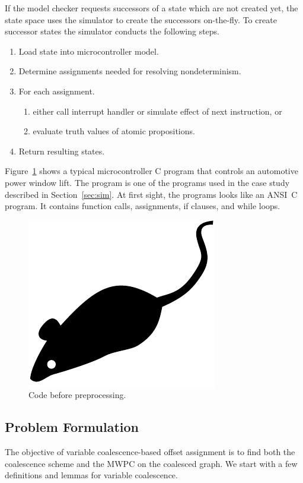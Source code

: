 \documentclass[prodmode,acmtecs]{acmsmall}
\begin{document}
\begin{algorithm}
\begin{algorithmic}[1]
If the model checker requests successors of a state which are not
created yet, the state space uses the simulator to create the
successors on-the-fly. To create successor states the simulator
conducts the following steps.
\begin{enumerate}
\item Load state into microcontroller model.
\item Determine assignments needed for resolving nondeterminism.
\item For each assignment.
      \begin{enumerate}
      \item either call interrupt handler or simulate effect of next instruction, or
      \item evaluate truth values of atomic propositions.
      \end{enumerate}
\item Return resulting states.
\end{enumerate}
Figure~\ref{fig:one} shows a typical microcontroller C program that
controls an automotive power window lift. The program is one of the
programs used in the case study described in Section~\ref{sec:sim}.
At first sight, the programs looks like an ANSI~C program. It
contains function calls, assignments, if clauses, and while loops.
\begin{figure}
\centerline{\includegraphics{acmsmall-mouse}}
\caption{Code before preprocessing.}
\label{fig:one}
\end{figure}

\subsection{Problem Formulation}

The objective of variable coalescence-based offset assignment is to find
both the coalescence scheme and the MWPC on the coalesced graph. We start
with a few definitions and lemmas for variable coalescence.



\end{algorithmic}
\end{algorithm}
\end{document}
